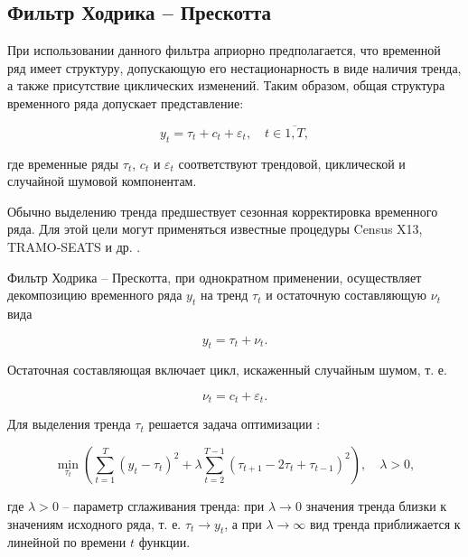 \documentclass[a4paper,14pt]{extreport}
\begin{document}
	\subsection{Фильтр Ходрика -- Прескотта}
	
	При использовании данного фильтра априорно предполагается, что временной ряд   имеет структуру, допускающую его нестационарность в виде наличия тренда, а также присутствие циклических изменений. Таким образом, общая структура временного ряда допускает представление:
	
	\begin{equation}
	y_t = \tau_t + c_t + \varepsilon_t, \quad t \in \overline{1,T},
	\label{eq:decomposition}
	\end{equation}
	
	где временные ряды  $\tau_t$, $c_t$ и $\varepsilon_t$ соответствуют трендовой, циклической и случайной шумовой компонентам. 
	
	Обычно выделению тренда предшествует сезонная корректировка временного ряда. Для этой цели могут применяться известные процедуры Census X13, TRAMO-SEATS и др. \cite{oecdCycleExtraction, esiMakingAlt}. 
	
	Фильтр Ходрика -- Прескотта, при однократном применении, осуществляет декомпозицию временного ряда $y_t$ на тренд $\tau_t$ и остаточную составляющую $\nu_t$ вида
	
	\begin{equation}
	y_t = \tau_t + \nu_t .
	\label{eq:decomp1}
	\end{equation}
	
	Остаточная составляющая включает цикл, искаженный случайным шумом, т. е. 
	
	\begin{equation}
	\nu_t = c_t + \varepsilon_t .
	\label{eq:decomp2}
	\end{equation}
	
	Для выделения тренда $\tau_t$ решается задача оптимизации \cite{hp_orig_paper}: 
	
	
	
	\begin{equation}	
	{
		\min_{ \tau_t }{
			( 
			\sum_{t=1}^{T} (y_t-\tau_t)^2 + 
			\lambda \sum_{t=2}^{T-1} (\tau_{t+1} - 2\tau_t + \tau_{t-1})^2
			)
		}, \quad
		\lambda > 0, 
	}
	\label{eq:hpmineq}
	\end{equation}
	
	где $\lambda > 0$ -- параметр сглаживания тренда: при $\lambda \rightarrow 0$ значения тренда близки к значениям исходного ряда, т. е. $\tau_t \rightarrow y_t$, а при $\lambda \rightarrow \infty$ вид тренда приближается к линейной по времени $t$ функции.
	
\end{document}
